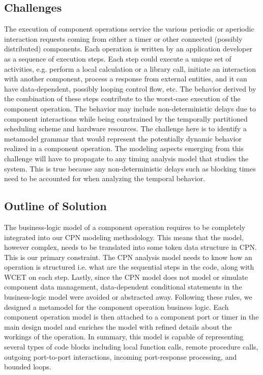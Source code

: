\subsection{Challenges}

The execution of component operations service the various periodic or aperiodic interaction requests coming from either a timer or other connected (possibly distributed) components. Each operation is written by an application developer as a sequence of execution steps. Each step could execute a unique set of activities, e.g. perform a local calculation or a library call, initiate an interaction with another component, process a response from external entities, and it can have data-dependent, possibly looping control flow, etc. The behavior derived by the combination of these steps contribute to the worst-case execution of the component operation. The behavior may include non-deterministic delays due to component interactions while being constrained by the temporally partitioned scheduling scheme and hardware resources. The challenge here is to identify a metamodel grammar that would represent the potentially dynamic behavior realized in a component operation. The modeling aspects emerging from this challenge will have to propagate to any timing analysis model that studies the system. This is true because any non-deterministic delays such as blocking times need to be accounted for when analyzing the temporal behavior.

\subsection{Outline of Solution}
The business-logic model of a component operation requires to be completely integrated into our CPN modeling methodology. This means that the model, however complex, needs to be translated into some token data structure in CPN. This is our primary constraint. The CPN analysis model needs to know how an operation is structured i.e. what are the sequential steps in the code, along with WCET on each step. Lastly, since the CPN model does not model or simulate component data management, data-dependent conditional statements in the business-logic model were avoided or abstracted away. Following these rules, we designed a metamodel for the component operation business logic. Each component operation model is then attached to a component port or timer in the main design model and enriches the model with refined details about the workings of the operation. In summary, this model is capable of representing several types of code blocks including local function calls, remote procedure calls, outgoing port-to-port interactions, incoming port-response processing, and bounded loops.

